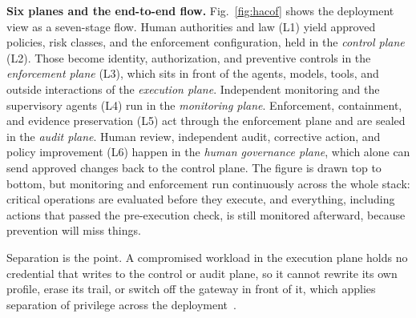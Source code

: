 \documentclass[journal]{IEEEtran}
\begin{document}
\textbf{Six planes and the end-to-end flow.} Fig.~\ref{fig:hacof} shows the deployment view as a seven-stage flow. Human authorities and law (L1) yield approved policies, risk classes, and the enforcement configuration, held in the \textit{control plane} (L2). Those become identity, authorization, and preventive controls in the \textit{enforcement plane} (L3), which sits in front of the agents, models, tools, and outside interactions of the \textit{execution plane}. Independent monitoring and the supervisory agents (L4) run in the \textit{monitoring plane}. Enforcement, containment, and evidence preservation (L5) act through the enforcement plane and are sealed in the \textit{audit plane}. Human review, independent audit, corrective action, and policy improvement (L6) happen in the \textit{human governance plane}, which alone can send approved changes back to the control plane. The figure is drawn top to bottom, but monitoring and enforcement run continuously across the whole stack: critical operations are evaluated before they execute, and everything, including actions that passed the pre-execution check, is still monitored afterward, because prevention will miss things.

Separation is the point. A compromised workload in the execution plane holds no credential that writes to the control or audit plane, so it cannot rewrite its own profile, erase its trail, or switch off the gateway in front of it, which applies separation of privilege across the deployment~\cite{saltzer1975protection}.
\end{document}
